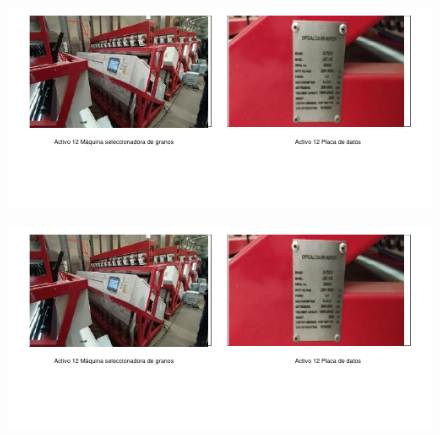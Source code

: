\begin{figure}[hbtp!]
	\centering
	\includegraphics[width=  \linewidth, page = 30]{../0.imagenes/CAP_12/cap_12}
\end{figure}
\newpage

\begin{figure}[hbtp!]
	\centering
	\includegraphics[width=  \linewidth, page = 31]{../0.imagenes/CAP_12/cap_12}
\end{figure}
\newpage

